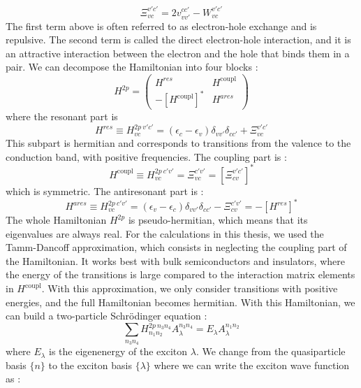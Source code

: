 \begin{equation}
	\Xi^{v'c'}_{vc} = 2v^{cc'}_{vv'} - W^{v'c'}_{vc} \label{eq:BSE_kernel_vc}
\end{equation}
The first term above is often referred to as electron-hole exchange and is repulsive. The second term is called the direct electron-hole interaction, and it is an attractive interaction between the electron and the hole that binds them in a pair.
We can decompose the Hamiltonian into four blocks :
\begin{equation}
	H^{2p} = \begin{pmatrix}
		H^{res} & H^{\text{coupl}} \\
		-[H^{\text{coupl}}]^* & H^{ares}
	\end{pmatrix}
\end{equation}
where the resonant part is 
\begin{equation}
	H^{res} \equiv H^{2p\ v'c'}_{vc} = (\epsilon_c - \epsilon_v) \delta_{vv'}\delta_{cc'} + \Xi^{v'c'}_{vc} \label{eq:H_BSE_res}
\end{equation}
This subpart is hermitian and corresponds to transitions from the valence to the conduction band, with positive frequencies. The coupling part is :
\begin{equation}
	H^{\text{coupl}} \equiv H^{2p\ c'v'}_{vc} = \Xi^{c'v'}_{vc} = [\Xi^{v'c'}_{cv}]^*
\end{equation}
which is symmetric. The antiresonant part is :
\begin{equation}
	H^{ares} \equiv H^{2p\ c'v'}_{vc} = (\epsilon_v - \epsilon_c)\delta_{vv'}\delta_{cc'} - \Xi^{c'v'}_{cv} = - [H^{res}]^*
\end{equation}
The whole Hamiltonian $H^{2p}$ is pseudo-hermitian, which means that its eigenvalues are always real. For the calculations in this thesis, we used the Tamm-Dancoff approximation, which consists in neglecting the coupling part of the Hamiltonian. It works best with bulk semiconductors and insulators, where the energy of the transitions is large compared to the interaction matrix elements in $H^{\text{coupl}}$. \cite{gruning2009exciton} With this approximation, we only consider transitions with positive energies, and the full Hamiltonian becomes hermitian.
With this Hamiltonian, we can build a two-particle Schrödinger equation :
\begin{equation}
	\sum_{n_3n_4} H^{2p\ n_3n_4}_{n_1n_2} A_\lambda^{n_3n_4} = E_\lambda A_\lambda^{n_1n_2} \label{eq:BSE_secular}
\end{equation}
where $E_\lambda$ is the eigenenergy of the exciton $\lambda$. We change from the quasiparticle basis $\{n\}$ to the exciton basis $\{\lambda\}$ where we can write the exciton wave function as :
